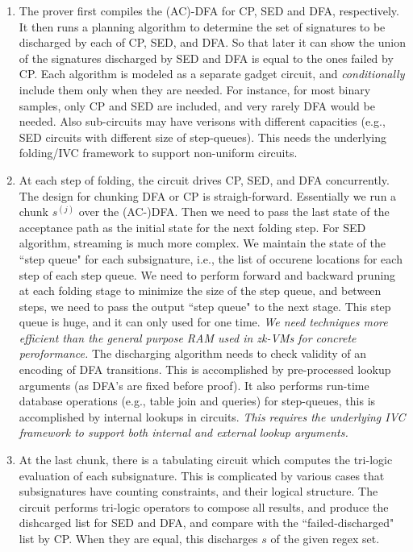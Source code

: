 \begin{enumerate} 
\item The prover first compiles the (AC)-DFA for CP, SED and DFA,
respectively. It then runs a planning algorithm to determine 
the set of signatures to be discharged by each of CP, SED, and DFA. 
So that later it can show the union of the signatures discharged 
by SED and DFA is equal to the ones failed by CP.
Each algorithm is modeled as a separate gadget circuit,
and {\em conditionally} include them only when they are needed. For instance,
for most binary samples, only CP and SED are included, and very rarely
DFA would be needed.  Also sub-circuits may have verisons with
different capacities (e.g., SED circuits with different size of step-queues).
This needs the underlying folding/IVC framework to support
non-uniform circuits.
\item At each step of folding, the circuit drives CP, SED, and DFA 
concurrently.
The design for chunking DFA or CP is straigh-forward. Essentially
we run a chunk $s^{(j)}$ over the (AC-)DFA.
Then we need to pass the last state of the acceptance path as the
initial state for the next folding step. 
For SED algorithm, streaming is much more complex. We 
maintain the state of the ``step queue" for each subsignature, 
i.e., the list of occurene locations for each step of each step queue.
We need to perform forward and backward pruning at each folding stage
to minimize the size of the step queue, and between steps,
we need to pass the output ``step queue" to the next stage.
This step queue is huge, and it can only used for one time.
{\em We need techniques more efficient than the general purpose
RAM used in zk-VMs for concrete peroformance.}
The discharging algorithm needs to check validity of
an encoding of DFA transitions. This is accomplished by
pre-processed lookup arguments (as DFA's are fixed before proof).
It also performs run-time database operations (e.g., table join and
queries) for step-queues, this is accomplished by
internal lookups in circuits. {\em This requires
the underlying IVC framework to support both internal and
external lookup arguments.}
\item At the last chunk, there is a tabulating circuit which
computes the tri-logic evaluation of each subsignature. This is
complicated by various cases that subsignatures have
counting constraints, and their logical structure.
The circuit performs tri-logic operators to compose all results,
and produce the dishcarged list for SED and DFA, and compare with
the ``failed-discharged" list by CP. 
When they are equal, this discharges  $s$ of the
given regex set.
\end{enumerate}


